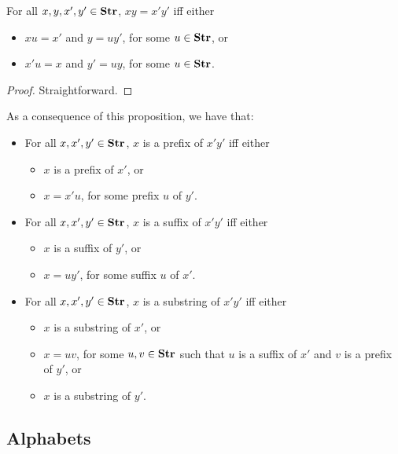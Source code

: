 \begin{proposition}
For all $x,y,x',y'\in\mathbf{Str}$, $xy=x'y'$ iff either
\begin{itemize}
\item $xu=x'$ and $y=uy'$, for some $u\in\mathbf{Str}$, or

\item $x'u=x$ and $y'=uy$, for some $u\in\mathbf{Str}$.
\end{itemize}
\end{proposition}

\begin{proof}
Straightforward.
\end{proof}

As a consequence of this proposition, we have that:
\begin{itemize}
\item For all $x,x',y'\in\mathbf{Str}$, $x$ is a prefix of $x'y'$ iff
either
\begin{itemize}
\item $x$ is a prefix of $x'$, or

\item $x=x'u$, for some prefix $u$ of $y'$.
\end{itemize}

\item For all $x,x',y'\in\mathbf{Str}$, $x$ is a suffix of $x'y'$ iff
either
\begin{itemize}
\item $x$ is a suffix of $y'$, or

\item $x=uy'$, for some suffix $u$ of $x'$.
\end{itemize}

\item For all $x,x',y'\in\mathbf{Str}$, $x$ is a substring of $x'y'$ iff
either
\begin{itemize}
\item $x$ is a substring of $x'$, or

\item $x=uv$, for some $u,v\in\mathbf{Str}$ such that
  $u$ is a suffix of $x'$ and $v$ is a prefix of $y'$, or

\item $x$ is a substring of $y'$.
\end{itemize}
\end{itemize}
%

\subsection{Alphabets}

